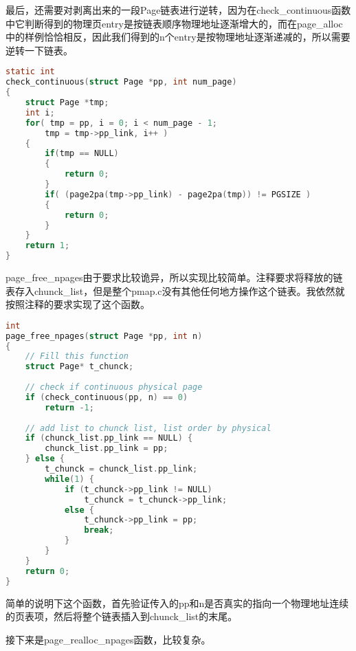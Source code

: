 \documentclass[11pt,a4paper]{article}
\begin{document}
最后，还需要对剥离出来的一段Page链表进行逆转，因为在check\_continuous函数中它判断得到的物理页entry是按链表顺序物理地址逐渐增大的，而在page\_alloc中的样例恰恰相反，因此我们得到的n个entry是按物理地址逐渐递减的，所以需要逆转一下链表。

\setmainfont{Consolas}
\begin{lstlisting}[language={C},firstnumber=1004,title=kern/pmap.c]
static int
check_continuous(struct Page *pp, int num_page)
{
	struct Page *tmp; 
	int i;
	for( tmp = pp, i = 0; i < num_page - 1;
		tmp = tmp->pp_link, i++ )
	{
		if(tmp == NULL) 
		{
			return 0;
		}
		if( (page2pa(tmp->pp_link) - page2pa(tmp)) != PGSIZE )
		{
			return 0;
		}
	}
	return 1;
}
\end{lstlisting}
\setmainfont[BoldFont=黑体]{宋体}

page\_free\_npages由于要求比较诡异，所以实现比较简单。注释要求将释放的链表存入chunck\_list，但是整个pmap.c没有其他任何地方操作这个链表。我依然就按照注释的要求实现了这个函数。

\setmainfont{Consolas}
\begin{lstlisting}[language={C},firstnumber=405,title=kern/pmap.c]
int
page_free_npages(struct Page *pp, int n)
{
	// Fill this function
	struct Page* t_chunck;
	
	// check if continuous physical page
	if (check_continuous(pp, n) == 0)
		return -1;
	
	// add list to chunck list, list order by physical
	if (chunck_list.pp_link == NULL) {
		chunck_list.pp_link = pp;
	} else {
		t_chunck = chunck_list.pp_link;
		while(1) {
			if (t_chunck->pp_link != NULL)
				t_chunck = t_chunck->pp_link;
			else {
				t_chunck->pp_link = pp;
				break;
			}
		}
	}
	return 0;
}
\end{lstlisting}
\setmainfont[BoldFont=黑体]{宋体}

简单的说明下这个函数，首先验证传入的pp和n是否真实的指向一个物理地址连续的页表项，然后将整个链表插入到chunck\_list的末尾。

接下来是page\_realloc\_npages函数，比较复杂。
\end{document}
